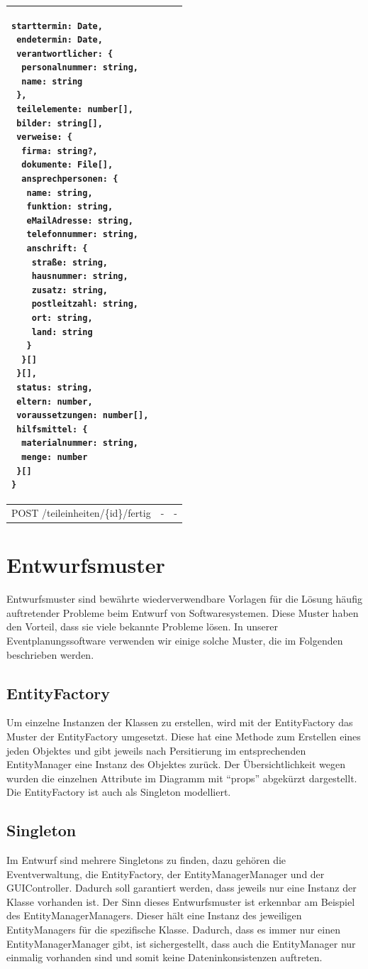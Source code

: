 \begin{longtable}{l|c|l}
\begin{lstlisting}[style=json-web-schnittstelle]
 starttermin: Date,
 endetermin: Date,
 verantwortlicher: {
  personalnummer: string,
  name: string
 },
 teilelemente: number[],
 bilder: string[],
 verweise: {
  firma: string?,
  dokumente: File[],
  ansprechpersonen: {
   name: string,
   funktion: string,
   eMailAdresse: string,
   telefonnummer: string,
   anschrift: {
    straße: string,
    hausnummer: string,
    zusatz: string,
    postleitzahl: string,
    ort: string,
    land: string
   }
  }[] 
 }[],
 status: string,
 eltern: number,
 voraussetzungen: number[],
 hilfsmittel: {
  materialnummer: string,
  menge: number
 }[]
}
    \end{lstlisting}\\
    \hline
    POST /teileinheiten/\{id\}/fertig & - & - \\
\end{longtable}

\section{Entwurfsmuster}
Entwurfsmuster sind bewährte wiederverwendbare Vorlagen für die Lösung häufig auftretender Probleme beim Entwurf von Softwaresystemen. Diese Muster haben den Vorteil, dass sie viele bekannte Probleme lösen. In unserer Eventplanungssoftware verwenden wir einige solche Muster, die im Folgenden beschrieben werden.
\subsection{EntityFactory}
Um einzelne Instanzen der Klassen zu erstellen, wird mit der EntityFactory das Muster der EntityFactory umgesetzt. Diese hat eine Methode zum Erstellen eines jeden Objektes und gibt jeweils nach Persitierung im entsprechenden EntityManager eine Instanz des Objektes zurück. Der Übersichtlichkeit wegen wurden die einzelnen Attribute im Diagramm mit \enquote{props} abgekürzt dargestellt. Die EntityFactory ist auch als Singleton modelliert.
\subsection{Singleton}
Im Entwurf sind mehrere Singletons zu finden, dazu gehören die Eventverwaltung, die EntityFactory, der EntityManagerManager und der GUIController. Dadurch soll garantiert werden, dass jeweils nur eine Instanz der Klasse vorhanden ist. Der Sinn dieses Entwurfsmuster ist erkennbar am Beispiel des EntityManagerManagers. Dieser hält eine Instanz des jeweiligen EntityManagers für die spezifische Klasse. Dadurch, dass es immer nur einen EntityManagerManager gibt, ist sichergestellt, dass auch die EntityManager nur einmalig vorhanden sind und somit keine Dateninkonsistenzen auftreten.
